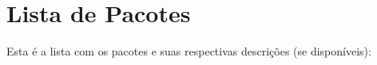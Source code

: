 \section{Lista de Pacotes}
Esta é a lista com os pacotes e suas respectivas descrições (se disponíveis):\begin{DoxyCompactList}
\item{}
\end{DoxyCompactList}
